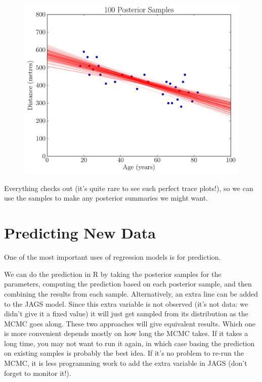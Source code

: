 \begin{figure}[ht!]
\begin{center}
\includegraphics[scale=0.5]{Figures/road_lines.pdf}
\end{center}
\end{figure}



Everything checks out (it's quite rare to see such perfect trace plots!), so
we can use the samples to make any posterior summaries we might want.

\section{Predicting New Data}
One of the most important uses of regression models is for prediction.

We can do the prediction in R by taking the posterior samples for the parameters,
computing the prediction based on each posterior sample, and then combining
the results from each sample. Alternatively, an extra line can be added to the
JAGS model. Since this extra variable is not observed (it's not data: we didn't
give it a fixed value) it will just get sampled from its distribution as the
MCMC goes along. These two approaches will give equivalent results. Which one
is more convenient depends mostly on how long the MCMC takes. If it takes a long
time, you may not want to run it again, in which case basing the prediction on
existing samples is probably the best idea. If it's no problem to re-run the
MCMC, it is less programming work to add the extra variable in JAGS (don't forget
to monitor it!).



